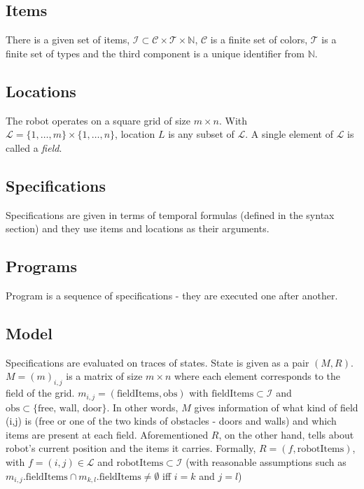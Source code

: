 \documentclass{article}
\begin{document}
\subsection*{Items}

There is a given set of items, $\mathcal{I} \subset \mathcal{C} \times \mathcal{T} \times \mathbb{N}$, $\mathcal{C}$ is a finite set of colors, $\mathcal{T}$ is a finite set of types and the third component is a unique identifier from $\mathbb{N}$.

\subsection*{Locations}
The robot operates on a square grid of size $m \times n$. With $\mathcal{L} = \{1, \ldots, m\} \times \{1, \ldots, n\}$, location $L$ is any subset of $\mathcal{L}$. A single element of $\mathcal{L}$ is called a \emph{field}.

\subsection*{Specifications}
Specifications are given in terms of temporal formulas (defined in the syntax section) and they use items and locations as their arguments. 

\subsection*{Programs}
Program is a sequence of specifications - they are executed one after another. 

\subsection*{Model}
Specifications are evaluated on traces of states. State is given as a pair $(M, R)$. $M = (m)_{i,j}$ is a matrix of size $m\times n$ where each element corresponds to the field of the grid. $m_{i,j} = (\text{fieldItems}, \text{obs})$ with $\text{fieldItems} \subset \mathcal{I}$ and $\text{obs} \subset \{\text{free, wall, door} \}$. In other words, $M$ gives information of what kind of field (i,j) is (free or one of the two kinds of obstacles - doors and walls) and which items are present at each field. Aforementioned $R$, on the other hand, tells about robot's current position and the items it carries. Formally, $R = (f, \text{robotItems})$, with $f = (i,j) \in \mathcal{L}$ and $\text{robotItems} \subset \mathcal{I}$ (with reasonable assumptions such as $m_{i,j}.\text{fieldItems} \cap m_{k,l}.\text{fieldItems} \neq \emptyset$ iff $i=k$ and $j = l$)
\end{document}
